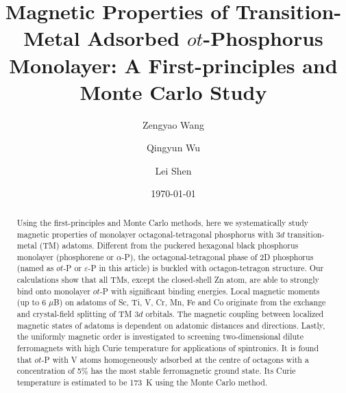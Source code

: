 \documentclass[%
superscriptaddress,
preprint,
showpacs,preprintnumbers,
 amsmath,amssymb,
prb,
]{revtex4-1}
\begin{document}


\title{Magnetic Properties of Transition-Metal Adsorbed $ot$-Phosphorus Monolayer: A First-principles and Monte Carlo Study}




\author{Zengyao Wang}
\author{Qingyun Wu}
\author{Lei Shen}

\date{\today}

\begin{abstract}

Using the first-principles and Monte Carlo methods, here we systematically study magnetic properties of monolayer octagonal-tetragonal phosphorus with 3$d$ transition-metal (TM) adatoms. Different from the puckered hexagonal black phosphorus monolayer (phosphorene or $\alpha$-P), the octagonal-tetragonal phase of 2D phosphorus (named as $ot$-P or $\varepsilon$-P in this article) is buckled with octagon-tetragon structure. Our calculations show that all TMs, except the closed-shell Zn atom, are able to strongly bind onto monolayer $ot$-P with significant binding energies. Local magnetic moments (up to 6 $\mu$B) on adatoms of Sc, Ti, V, Cr, Mn, Fe and Co originate from the exchange and crystal-field splitting of TM 3$d$ orbitals. The magnetic coupling between localized magnetic states of adatoms is dependent on adatomic distances and directions. Lastly, the uniformly magnetic order is investigated to screening two-dimensional dilute ferromagnets with high Curie temperature for applications of spintronics. It is found that $ot$-P with V atoms homogeneously adsorbed at the centre of octagons with a concentration of 5\% has the most stable ferromagnetic ground state. Its Curie temperature is estimated to be 173~K using the Monte Carlo method.
\end{abstract}
\end{document}
